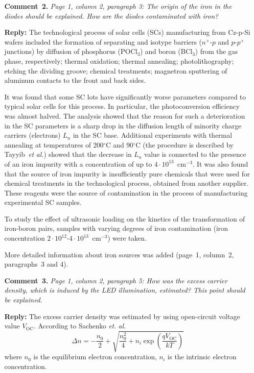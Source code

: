 \documentclass[aip,jap,preprint]{revtex4-1}
\begin{document}
\vspace{1cm}
\noindent
\textcolor[rgb]{0.00,0.50,1.00}{\textbf{Comment~2.}}
\emph{Page 1, column 2, paragraph 3: The origin of the iron in the diodes should be explained. How are the diodes contaminated with iron? }

\noindent
\textcolor[rgb]{0.51,0.00,0.00}{\textbf{Reply:}}
The technological process of solar cells (SCs) manufacturing from Cz-p-Si wafers included the formation of separating and isotype barriers ($n^+$-$p$ and $p$-$p^+$ junctions) by diffusion of phosphorus (POCl$_3$) and boron (BCl$_3$) from the gas phase, respectively; thermal oxidation; thermal annealing; photolithography; etching the dividing groove; chemical treatments; magnetron sputtering of aluminum contacts to the front and back sides.

It was found that some SC lots have significantly worse parameters compared to typical solar cells for this process.
In particular, the photoconversion efficiency was almost halved.
The analysis showed that the reason for such a deterioration in the SC parameters is a sharp drop in the diffusion length of minority charge carriers (electrons) $L_n$ in the SC base.
Additional experiments with thermal annealing at temperatures of 200$^\circ$C and 90$^\circ$C
(the procedure is described by Tayyib~\emph{et al.}\cite{TAYYIB201221})
showed that the decrease in $L_n$ value is connected to the presence of an iron impurity with a concentration of up to $4\cdot10^{13}$~cm$^{-3}$.
It was also found that the source of iron impurity is insufficiently pure chemicals that were used for chemical treatments in the technological process, obtained from another supplier.
These reagents were the source of contamination in the process of manufacturing experimental SC samples.

To study the effect of ultrasonic loading on the kinetics of the transformation  of iron-boron pairs, samples with varying degrees of iron contamination (iron concentration $2\cdot10^{12}$-$4\cdot10^{13}$~cm$^{-3}$) were taken.

More detailed information about iron sources was added (page~1, column~2, paragraphs~3 and 4).


\vspace{1cm}
\noindent
\textcolor[rgb]{0.00,0.50,1.00}{\textbf{Comment~3.}}
\emph{Page 1, column 2, paragraph 5: How was the excess carrier density, which is induced by the LED illumination, estimated? This point should be explained. }

\noindent
\textcolor[rgb]{0.51,0.00,0.00}{\textbf{Reply:}}
The excess carrier density was estimated by using open-circuit voltage value $V_\mathrm{OC}$.
According to Sachenko \emph{et. al.}\cite{JAPSach}
\begin{equation}
  \Delta n=-\frac{n_0}{2}+\sqrt{\frac{n_0^2}{4}+n_i\exp\left(\frac{qV_\mathrm{OC}}{kT}\right)}
\end{equation}
where
$n_0$ is the equilibrium electron concentration,
$n_i$ is the intrinsic electron concentration.
\end{document}
